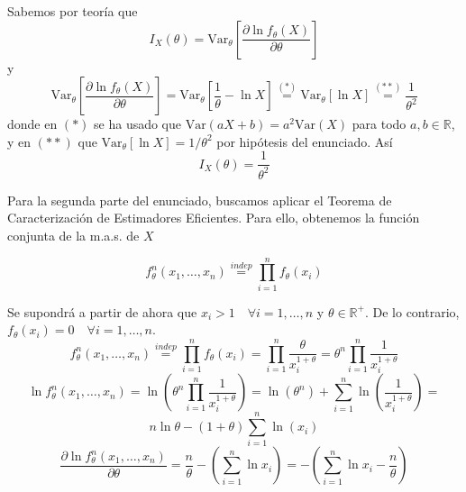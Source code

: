 \documentclass[12pt]{article}
\newcommand{\V}{\mathrm{Var}}
\newcommand{\R}{\mathbb{R}}
\newcommand{\Rmas}{\R^{+}}
\begin{document}
\begin{ejercicio}
\begin{enumerate}[label=\alph*)]
\begin{enumerate}[label=\alph*)]
                    Sabemos por teoría que 
                    $$I_X(\theta) = \V_\theta \left[ \dfrac{\partial \ln f_\theta(X)}{\partial \theta} \right]$$
                    y
                    $$\V_\theta \left[ \dfrac{\partial \ln f_\theta(X)}{\partial \theta} \right] = \V_\theta \left[ \dfrac{1}{\theta} - \ln X \right] \stackrel{(*)}{=}
                    \V_\theta[\ln X] \stackrel{(**)}{=} \dfrac{1}{\theta^2}$$
                    donde en $(*)$ se ha usado que $\V(aX + b) = a^2 \V(X)$ para todo $a,b \in \R$, y en $(**)$ que $\V_\theta[\ln X] = 1/\theta^2$ por hipótesis del enunciado.
                    Así $$I_X(\theta) = \dfrac{1}{\theta^2}$$

                    Para la segunda parte del enunciado, buscamos aplicar el Teorema de Caracterización de Estimadores Eficientes. Para ello, obtenemos la función conjunta de la m.a.s. de $X$

                    $$f_\theta^n(x_1, \ldots, x_n) \stackrel{indep}{=} \prod_{i=1}^n f_\theta(x_i)$$

                    Se supondrá a partir de ahora que $x_i > 1 \quad \forall i=1,\ldots,n$ y $\theta \in \Rmas$. De lo contrario, $f_\theta(x_i) = 0 \quad \forall i = 1, \ldots, n$.
                    $$f_\theta^n(x_1, \ldots, x_n) \stackrel{indep}{=} \prod_{i=1}^n f_\theta(x_i) = \prod_{i=1}^n 
                    \frac{\theta}{x_i^{1+\theta}} = \theta^n \prod_{i=1}^n \dfrac{1}{x_i^{1+\theta}} $$
                    $$\ln f_\theta^n(x_1, \ldots, x_n) = \ln \left( \theta^n \prod_{i=1}^n \dfrac{1}{x_i^{1+\theta}} \right) = \ln(\theta^n) + \sum_{i=1}^{n} \ln  \left(\dfrac{1}{x_i^{1+\theta}} \right) = $$
                    $$n \ln \theta - (1+\theta) \sum_{i=1}^{n} \ln(x_i) $$
                    $$\dfrac{\partial \ln f_\theta^n(x_1, \ldots, x_n)}{\partial \theta} = \dfrac{n}{\theta} - \left( \sum_{i=1}^{n} \ln x_i \right) = - \left(\sum_{i=1}^{n} \ln x_i - \dfrac{n}{\theta} \right) $$


\end{enumerate}
\end{enumerate}
\end{ejercicio}
\end{document}
